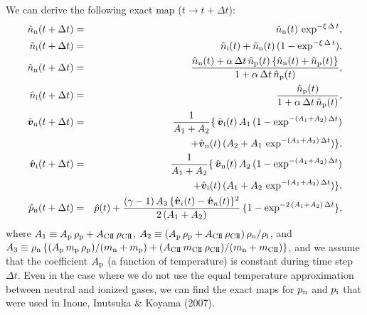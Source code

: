 \documentclass[12pt,preprint]{aastex}
\newcommand{\bvel}{\boldmath\mbox{$v$}\unboldmath}
\begin{document}
We can derive the following exact map ($t\rightarrow t+\Delta t$): 
\begin{eqnarray}
\tilde{n}_{\rm n}(t+\Delta t) &=& \tilde{n}_{\rm n}(t)\,\exp^{-\xi\,\Delta\,t},\\
\tilde{n}_{\rm i}(t+\Delta t) &=& \tilde{n}_{\rm i}(t)+\tilde{n}_{\rm n}(t)\,(1-\exp^{-\xi\,\Delta\,t}),\\
\hat{n}_{\rm n}(t+\Delta t) &=& \frac{\hat{n}_{\rm n}(t)+\alpha\,\Delta t\,\hat{n}_{\rm p}(t)\,\{\hat{n}_{\rm n}(t)+\hat{n}_{\rm p}(t)\}}{1+\alpha\,\Delta t\,\hat{n}_{\rm p}(t)},\\
\hat{n}_{\rm i}(t+\Delta t) &=& \frac{\hat{n}_{\rm p}(t)}{1+\alpha\,\Delta t\,\hat{n}_{\rm p}(t)},\\
\hat{\bvel}_{\rm n}(t+\Delta t) &=& \frac{1}{A_{1}+A_{2}}\{\,\hat{\bvel}_{\rm i}(t)\,A_{1}\,( 1-\exp^{-(A_{1}+A_{2})\,\Delta t} ) \nonumber\\&& +\hat{\bvel}_{\rm n}(t)\,( A_{\rm 2}+A_{\rm 1}\,\exp^{-(A_{1}+A_{2})\,\Delta t} ) \},\label{STS1}\\
\hat{\bvel}_{\rm i}(t+\Delta t) &=& \frac{1}{A_{1}+A_{2}}\{\,\hat{\bvel}_{\rm n}(t)\,A_{2}\,( 1-\exp^{-(A_{1}+A_{2})\,\Delta t} ) \nonumber\\&& +\hat{\bvel}_{\rm i}(t)\,( A_{\rm 1}+A_{\rm 2}\,\exp^{-(A_{1}+A_{2})\,\Delta t} ) \},\label{STS2}\\
\hat{p}_{\rm n}(t+\Delta t) &=& \hat{p}(t)+\frac{(\gamma-1)\,A_{3}\,\{\hat{\bvel}_{i}(t)-\hat{\bvel}_{n}(t)\}^{2}}{2\,(A_{1}+A_{2})}\,\{ 1-\exp^{-2\,(A_{1}+A_{2})\,\Delta t} \},
\end{eqnarray}
where $A_{\rm 1}\equiv A_{\rm p}\,\rho_{\rm p}+A_{\rm CI\hspace{-.1em}I}\,\rho_{\rm CI\hspace{-.1em}I}$, 
$A_{\rm 2}\equiv (A_{\rm p}\,\rho_{\rm p}+A_{\rm CI\hspace{-.1em}I}\,\rho_{\rm CI\hspace{-.1em}I})\,\rho_{\rm n}/\rho_{\rm i}$, and 
$A_{3}\equiv \rho_{\rm n}\,\{(A_{\rm p}\,m_{\rm p}\,\rho_{\rm p})/(m_{\rm n}+m_{\rm p})+(A_{\rm CI\hspace{-.1em}I}\,m_{\rm CI\hspace{-.1em}I}\,\rho_{\rm CI\hspace{-.1em}I})/(m_{\rm n}+m_{\rm CI\hspace{-.1em}I})\}$, 
and we assume that the coefficient $A_{\rm p}$ 
(a function of temperature)
is constant during time step $\Delta t$.
Even in the case where we do not use the equal temperature approximation between neutral and ionized gases, we can find the exact maps for $p_{\rm n}$ and $p_{\rm i}$
that were used in Inoue, Inutsuka \& Koyama (2007).
\end{document}
